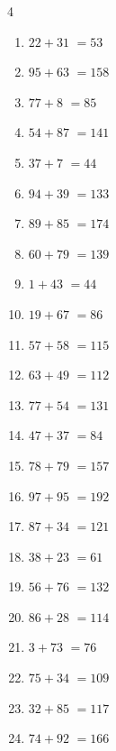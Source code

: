 \begin{multicols}{4}
\begin{enumerate}
  \item $22+31$
        $=53$

  \item $95+63$
        $=158$

  \item $77+8$
        $=85$

  \item $54+87$
        $=141$

  \item $37+7$
        $=44$

  \item $94+39$
        $=133$

  \item $89+85$
        $=174$

  \item $60+79$
        $=139$

  \item $1+43$
        $=44$

  \item $19+67$
        $=86$

  \item $57+58$
        $=115$

  \item $63+49$
        $=112$

  \item $77+54$
        $=131$

  \item $47+37$
        $=84$

  \item $78+79$
        $=157$

  \item $97+95$
        $=192$

  \item $87+34$
        $=121$

  \item $38+23$
        $=61$

  \item $56+76$
        $=132$

  \item $86+28$
        $=114$

  \item $3+73$
        $=76$

  \item $75+34$
        $=109$

  \item $32+85$
        $=117$

  \item $74+92$
        $=166$


\end{enumerate}
\end{multicols}
